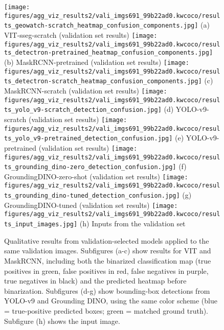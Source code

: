 

\newcommand{\FP}{\textcolor{fpred}{false positive}}
\newcommand{\TPpred}{\textcolor{tppred}{true-positive prediction}}
\newcommand{\FN}{\textcolor{fntrue}{false negative}}
\newcommand{\TPtrue}{\textcolor{tptrue}{true positive (GT)}}
\newcommand{\TN}{\textcolor{neutral}{true negative}}


\begin{figure*}[ht]
\centering
\texttt{[image: figures/agg\_viz\_results2/vali\_imgs691\_99b22ad0.kwcoco/results\_geowatch-scratch\_heatmap\_confusion\_components.jpg]}%
\hfill
(a) VIT-sseg-scratch (validation set results)
\texttt{[image: figures/agg\_viz\_results2/vali\_imgs691\_99b22ad0.kwcoco/results\_detectron-pretrained\_heatmap\_confusion\_components.jpg]}%
\hfill
(b) MaskRCNN-pretrained (validation set results)
\texttt{[image: figures/agg\_viz\_results2/vali\_imgs691\_99b22ad0.kwcoco/results\_detectron-scratch\_heatmap\_confusion\_components.jpg]}%
\hfill
(c) MaskRCNN-scratch (validation set results)
\texttt{[image: figures/agg\_viz\_results2/vali\_imgs691\_99b22ad0.kwcoco/results\_yolo\_v9-scratch\_detection\_confusion.jpg]}%
\hfill
(d) YOLO-v9-scratch (validation set results)
\texttt{[image: figures/agg\_viz\_results2/vali\_imgs691\_99b22ad0.kwcoco/results\_yolo\_v9-pretrained\_detection\_confusion.jpg]}%
\hfill
(e) YOLO-v9-pretrained (validation set results)
\texttt{[image: figures/agg\_viz\_results2/vali\_imgs691\_99b22ad0.kwcoco/results\_grounding\_dino-zero\_detection\_confusion.jpg]}%
\hfill
(f) GroundingDINO-zero-shot (validation set results)
\texttt{[image: figures/agg\_viz\_results2/vali\_imgs691\_99b22ad0.kwcoco/results\_grounding\_dino-tuned\_detection\_confusion.jpg]}%
\hfill
(g) GroundingDINO-tuned (validation set results)
\texttt{[image: figures/agg\_viz\_results2/vali\_imgs691\_99b22ad0.kwcoco/results\_input\_images.jpg]}%
\hfill
(h) Inputs from the validation set
\caption[]{
    Qualitative results from validation-selected models applied to the same validation images.
    Subfigures (a-c) show results for VIT and MaskRCNN, including both the binarized classification map 
    (\textcolor{tptrue}{true positives in green}, 
     \textcolor{fpred}{false positives in red}, 
     \textcolor{fntrue}{false negatives in purple}, 
     \textcolor{neutral}{true negatives in black}) 
    and the predicted heatmap before binarization.  
    Subfigures (d-g) show bounding-box detections from YOLO-v9 and Grounding DINO, using the same color scheme 
    (\textcolor{tppred}{blue = true-positive predicted boxes}; 
     \textcolor{tptrue}{green = matched ground truth}).
    Subfigure (h) shows the input image.
}
\label{fig:vali_results_all_models}
\end{figure*}

